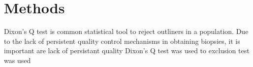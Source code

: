 \chapter{Methods}

Dixon's Q test is common statistical tool to reject outliners in a population. Due to the lack of persistent quality control mechanisms in obtaining biopsies, it is important are lack of persistant quality Dixon's Q test was used to   exclusion test was used 